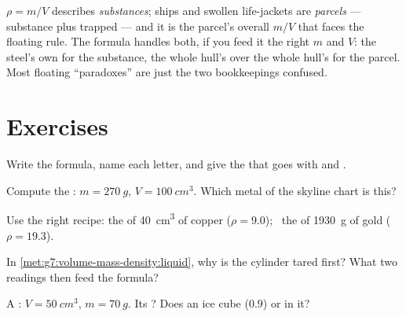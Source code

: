 \begin{remark}\label{rem:g7:volume-mass-density:parcel}
$\rho = m/V$ describes \emph{substances}; ships and swollen
life-jackets are \emph{parcels} --- substance plus trapped 
--- and it is the parcel's overall $m/V$ that faces the floating
rule. The formula handles both, if you feed it the right $m$ and
$V$: the steel's own  for the substance, the whole hull's
 over the whole hull's  for the parcel. Most floating
``paradoxes'' are just the two bookkeepings confused.
\end{remark}

\section{Exercises}

\begin{exercise}[$\star$]\label{exo:g7:volume-mass-density:1}
Write the  formula, name each letter, and give the 
that goes with  and .
\end{exercise}

\begin{exercise}[$\star$]\label{exo:g7:volume-mass-density:2}
Compute the : $m = \qty{270}{g}$, $V = \qty{100}{cm^3}$.
Which metal of the skyline chart is this?
\end{exercise}

\begin{exercise}[$\star$]\label{exo:g7:volume-mass-density:3}
Use the right recipe: the  of \qty{40}{cm^3} of copper
($\rho = 9.0$); \ the  of \qty{1930}{g} of gold
($\rho = 19.3$).
\end{exercise}

\begin{exercise}[$\star$]\label{exo:g7:volume-mass-density:4}
In \cref{met:g7:volume-mass-density:liquid}, why is the cylinder
tared first? What two readings then feed the formula?
\end{exercise}

\begin{exercise}[$\star$]\label{exo:g7:volume-mass-density:5}
A : $V = \qty{50}{cm^3}$, $m = \qty{70}{g}$. Its ?
Does an ice cube ($0.9$)  or  in it?
\end{exercise}

